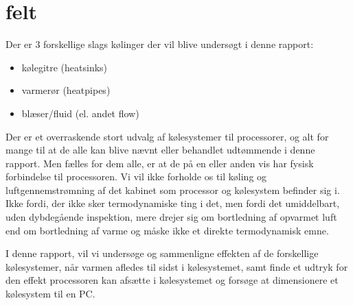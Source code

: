 \section{felt}

Der er 3 forskellige slags kølinger der vil blive undersøgt i denne rapport: 

\begin{itemize}
	\item kølegitre (heatsinks)
	\item varmerør (heatpipes)
	\item blæser/fluid (el. andet flow)
\end{itemize}

Der er et overraskende stort udvalg af kølesystemer til processorer, og alt for mange til at de alle kan blive nævnt eller behandlet udtømmende i denne rapport. Men fælles for dem alle, er at de på en eller anden vis har fysisk forbindelse til processoren.
Vi vil ikke forholde os til køling og luftgennemstrømning af det kabinet som processor og kølesystem befinder sig i. Ikke fordi, der ikke sker termodynamiske ting i det, men fordi det umiddelbart, uden dybdegående inspektion, mere drejer sig om bortledning af opvarmet luft end om bortledning af varme og måske ikke et direkte termodynamisk emne.

I denne rapport, vil vi undersøge og sammenligne effekten af de forskellige kølesystemer, når varmen afledes til sidst i kølesystemet, samt finde et udtryk for den effekt processoren kan afsætte i kølesystemet og forsøge at dimensionere et kølesystem til en PC.

